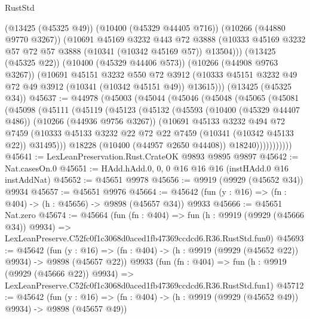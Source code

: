 \begin{lexlean}{RustStd}
\begin{coremodule}
        (@13425 (@45325 @49))
        (@10400 (@45329 @44405 @716))
        (@10266 (@44880 @9770 @3267))
        (@10691
          @45169
          @3232
          @443
          @72
          @3888
          (@10333 @45169 @3232 @57 @72 @57 @3888 (@10341 (@10342 @45169 @57)) @13504)))
      (@13425 (@45325 @22))
      (@10400 (@45329 @44406 @573))
      (@10266 (@44908 @9763 @3267))
      (@10691
        @45151
        @3232
        @550
        @72
        @3912
        (@10333 @45151 @3232 @49 @72 @49 @3912 (@10341 (@10342 @45151 @49)) @13615)))
    (@13425 (@45325 @34))
@45637 := @44978
    (@45003
      (@45044
        (@45046
          (@45048
            (@45065
              (@45081
                (@45098
                  (@45111
                    (@45119
                      (@45123
                        (@45132
                          (@45593
                            (@10400 (@45329 @44407 @486))
                            (@10266 (@44936 @9756 @3267))
                            (@10691
                              @45133
                              @3232
                              @494
                              @72
                              @7459
                              (@10333
                                @45133
                                @3232
                                @22
                                @72
                                @22
                                @7459
                                (@10341 (@10342 @45133 @22))
                                @31495)))
                          @18228
                          (@10400 (@44957 @2650 @44408))
                          @18240)))))))))))
@45641 := LexLeanPreservation.Rust.CrateOK @9893 @9895 @9897
@45642 := Nat.casesOn.{0}
@45651 := HAdd.hAdd.{0, 0, 0} @16 @16 @16 (instHAdd.{0} @16 instAddNat)
@45652 := @45651 @9978
@45656 := @9919 (@9929 (@45652 @34)) @9934
@45657 := @45651 @9976
@45664 := @45642 (fun (y : @16) => (fn : @404) -> (h : @45656) -> @9898 (@45657 @34)) @9933
@45666 := @45651 Nat.zero
@45674 := @45664
    (fun (fn : @404) =>
    fun (h : @9919 (@9929 (@45666 @34)) @9934) =>
    LexLeanPreserve.C52fc0f1c3068d0aced1fb47369ccdcd6.R36.RustStd.fun0)
@45693 := @45642
    (fun (y : @16) => (fn : @404) -> (h : @9919 (@9929 (@45652 @22)) @9934) -> @9898 (@45657 @22))
    @9933
    (fun (fn : @404) =>
    fun (h : @9919 (@9929 (@45666 @22)) @9934) =>
    LexLeanPreserve.C52fc0f1c3068d0aced1fb47369ccdcd6.R36.RustStd.fun1)
@45712 := @45642
    (fun (y : @16) => (fn : @404) -> (h : @9919 (@9929 (@45652 @49)) @9934) -> @9898 (@45657 @49))

\end{coremodule}
\end{lexlean}
